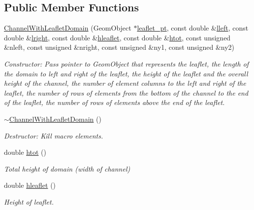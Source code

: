 \subsection*{Public Member Functions}
\begin{DoxyCompactItemize}
\item 
\hyperlink{classoomph_1_1ChannelWithLeafletDomain_a6cca7d06136de0c76facec2a92b0939e}{Channel\+With\+Leaflet\+Domain} (Geom\+Object $\ast$\hyperlink{classoomph_1_1ChannelWithLeafletDomain_a91d7d8d2f564c5e9d2ee07449b2653c9}{leaflet\+\_\+pt}, const double \&\hyperlink{classoomph_1_1ChannelWithLeafletDomain_a5538092062970dbd2f02218a05639d49}{lleft}, const double \&\hyperlink{classoomph_1_1ChannelWithLeafletDomain_aee74846110e70cd5538386e1ccb0ce7c}{lright}, const double \&\hyperlink{classoomph_1_1ChannelWithLeafletDomain_af70ada72d505ebea468d1000b04c20e1}{hleaflet}, const double \&\hyperlink{classoomph_1_1ChannelWithLeafletDomain_aaf195c688423473ed97af61f8a1467ab}{htot}, const unsigned \&nleft, const unsigned \&nright, const unsigned \&ny1, const unsigned \&ny2)
\begin{DoxyCompactList}\small\item\em Constructor\+: Pass pointer to Geom\+Object that represents the leaflet, the length of the domain to left and right of the leaflet, the height of the leaflet and the overall height of the channel, the number of element columns to the left and right of the leaflet, the number of rows of elements from the bottom of the channel to the end of the leaflet, the number of rows of elements above the end of the leaflet. \end{DoxyCompactList}\item 
\hyperlink{classoomph_1_1ChannelWithLeafletDomain_a7f00e3d9ed53ca70519671446fe60510}{$\sim$\+Channel\+With\+Leaflet\+Domain} ()
\begin{DoxyCompactList}\small\item\em Destructor\+: Kill macro elements. \end{DoxyCompactList}\item 
double \hyperlink{classoomph_1_1ChannelWithLeafletDomain_aaf195c688423473ed97af61f8a1467ab}{htot} ()
\begin{DoxyCompactList}\small\item\em Total height of domain (width of channel) \end{DoxyCompactList}\item 
double \hyperlink{classoomph_1_1ChannelWithLeafletDomain_af70ada72d505ebea468d1000b04c20e1}{hleaflet} ()
\begin{DoxyCompactList}\small\item\em Height of leaflet. \end{DoxyCompactList}\item 

\end{DoxyCompactItemize}
